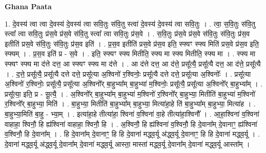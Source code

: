 \documentclass[17pt]{extarticle}
\begin{document}
\textbf{Ghana Paata } \newline

1. दे॒वस्य॑ त्वा त्वा दे॒वस्य॑ दे॒वस्य॑ त्वा सवि॒तुः स॑वि॒तु स्त्वा॑ दे॒वस्य॑ दे॒वस्य॑ त्वा सवि॒तुः । . त्वा॒ स॒वि॒तुः स॑वि॒तु स्त्वा᳚ त्वा सवि॒तुः प्र॑स॒वे प्र॑स॒वे स॑वि॒तु स्त्वा᳚ त्वा सवि॒तुः प्र॑स॒वे । . स॒वि॒तुः प्र॑स॒वे प्र॑स॒वे स॑वि॒तुः स॑वि॒तुः प्र॑स॒व इतीति॑ प्रस॒वे स॑वि॒तुः स॑वि॒तुः प्र॑स॒व इति॑ । . प्र॒स॒व इतीति॑ प्रस॒वे प्र॑स॒व इति॒ स्फ्यꣳ स्फ्य मिति॑ प्रस॒वे प्र॑स॒व इति॒ स्फ्यम् । . प्र॒स॒व इति॑ प्र - स॒वे । . इति॒ स्फ्यꣳ स्फ्य मितीति॒ स्फ्य मा स्फ्य मितीति॒ स्फ्य मा । . स्फ्य मा स्फ्यꣳ स्फ्य मा द॑त्ते दत्त॒ आ स्फ्यꣳ स्फ्य मा द॑त्ते । . आ द॑त्ते दत्त॒ आ द॑त्ते॒ प्रसू᳚त्यै॒ प्रसू᳚त्यै दत्त॒ आ द॑त्ते॒ प्रसू᳚त्यै । . द॒त्ते॒ प्रसू᳚त्यै॒ प्रसू᳚त्यै दत्ते दत्ते॒ प्रसू᳚त्या अ॒श्विनो॑ र॒श्विनोः॒ प्रसू᳚त्यै दत्ते दत्ते॒ प्रसू᳚त्या अ॒श्विनोः᳚ । . प्रसू᳚त्या अ॒श्विनो॑ र॒श्विनोः॒ प्रसू᳚त्यै॒ प्रसू᳚त्या अ॒श्विनो᳚र् बा॒हुभ्या᳚म् बा॒हुभ्या॑ म॒श्विनोः॒ प्रसू᳚त्यै॒ प्रसू᳚त्या अ॒श्विनो᳚र् बा॒हुभ्या᳚म् । . प्रसू᳚त्या॒ इति॒ प्र - सू॒त्यै॒ । . अ॒श्विनो᳚र् बा॒हुभ्या᳚म् बा॒हुभ्या॑ म॒श्विनो॑ र॒श्विनो᳚र् बा॒हुभ्या॒ मितीति॑ बा॒हुभ्या॑ म॒श्विनो॑ र॒श्विनो᳚र् बा॒हुभ्या॒ मिति॑ । . बा॒हुभ्या॒ मितीति॑ बा॒हुभ्या᳚म् बा॒हुभ्या॒ मित्या॑हा॒हे ति॑ बा॒हुभ्या᳚म् बा॒हुभ्या॒ मित्या॑ह । . बा॒हुभ्या॒मिति॑ बा॒हु - भ्या॒म् । . इत्या॑हा॒हे तीत्या॑हा॒ श्विना॑ व॒श्विना॑ वा॒हे तीत्या॑हा॒श्विनौ᳚ । . आ॒हा॒श्विना॑ व॒श्विना॑ वाहाहा॒ श्विनौ॒ हि ह्य॑श्विना॑ वाहाहा॒ श्विनौ॒ हि । . अ॒श्विनौ॒ हि ह्य॑श्विना॑ व॒श्विनौ॒ हि दे॒वाना᳚म् दे॒वानाꣳ॒॒ ह्य॑श्विना॑ व॒श्विनौ॒ हि दे॒वाना᳚म् । . हि दे॒वाना᳚म् दे॒वानाꣳ॒॒ हि हि दे॒वाना॑ मद्ध्व॒र्यू अ॑द्ध्व॒र्यू दे॒वानाꣳ॒॒ हि हि दे॒वाना॑ मद्ध्व॒र्यू । . दे॒वाना॑ मद्ध्व॒र्यू अ॑द्ध्व॒र्यू दे॒वाना᳚म् दे॒वाना॑ मद्ध्व॒र्यू आस्ता॒ मास्ता॑ मद्ध्व॒र्यू दे॒वाना᳚म् दे॒वाना॑ मद्ध्व॒र्यू आस्ता᳚म् । \newline
\end{document}
